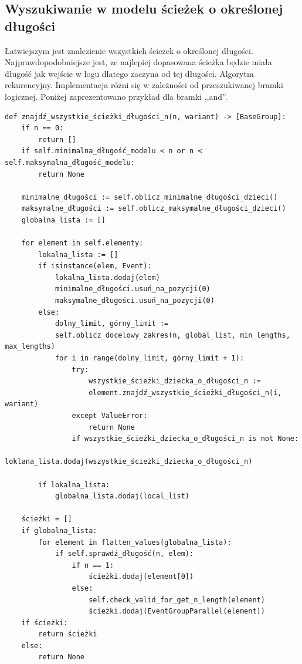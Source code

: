 \subsection{Wyszukiwanie w modelu ścieżek o określonej długości}

Łatwiejszym jest znalezienie wszystkich ścieżek o określonej długości. Najprawdopodobniejsze jest, ze najlepiej dopasowana ścieżka będzie miała długość jak wejście w logu dlatego zaczyna od tej długości. 
Algorytm rekurencyjny. Implementacja różni się w zależności od przeszukiwanej bramki logicznej. Poniżej zaprezentowano przykład dla bramki ,,and''.  
\lstset{caption=Wyszukiwanie procesów o długości n, captionpos=b}
\lstset{label=src:get_n_length, frame=single}
\begin{lstlisting}[escapeinside=``]
def znajdź_wszystkie_ścieżki_długości_n(n, wariant) -> [BaseGroup]:
    if n == 0:
        return []
    if self.minimalna_długość_modelu < n or n < self.maksymalna_długość_modelu:
        return None

    minimalne_długości := self.oblicz_minimalne_długości_dzieci()
    maksymalne_długości := self.oblicz_maksymalne_długości_dzieci()
    globalna_lista := []

    for element in self.elementy:
        lokalna_lista := []
        if isinstance(elem, Event):
            lokalna_lista.dodaj(elem)
            minimalne_długości.usuń_na_pozycji(0)
            maksymalne_długości.usuń_na_pozycji(0)
        else:
            dolny_limit, górny_limit := 
            self.oblicz_docelowy_zakres(n, global_list, min_lengths, max_lengths)
            for i in range(dolny_limit, górny_limit + 1):
                try:
                    wszystkie_ścieżki_dziecka_o_długości_n := 
                    element.znajdź_wszystkie_ścieżki_długości_n(i, wariant)
                except ValueError:
                    return None
                if wszystkie_ścieżki_dziecka_o_długości_n is not None:
                    loklana_lista.dodaj(wszystkie_ścieżki_dziecka_o_długości_n)

        if lokalna_lista:
            globalna_lista.dodaj(local_list)

    ścieżki = []
    if globalna_lista:
        for element in flatten_values(globalna_lista):
            if self.sprawdź_długość(n, elem):
                if n == 1:
                    ścieżki.dodaj(element[0])
                else:
                    self.check_valid_for_get_n_length(element)
                    ścieżki.dodaj(EventGroupParallel(element))
    if ścieżki:
        return ścieżki
    else:
        return None
\end{lstlisting}

